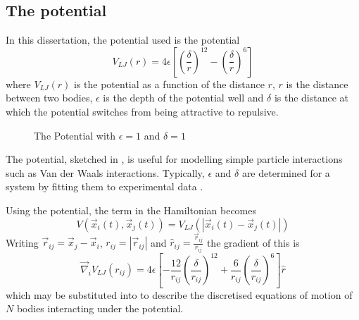 \subsection{The \LennardJones{} potential}
%
In this dissertation, the \twobody{} potential used is
the \LennardJones{} potential
\cite{jones1924determination}
%
\begin{equation}
    \label{eqn:the_lennard_jones_potential}
    V_{LJ}(r) = 4\epsilon \left[
        \left( \frac{\delta}{r} \right)^{12}
        - \left( \frac{\delta}{r} \right)^{6}
    \right]
\end  {equation}
where $V_{LJ}(r)$ is the \LennardJones{} potential as
a function of the distance $r$,
$r$ is the distance between two bodies,
$\epsilon$ is the depth of the potential well and
$\delta$ is the distance at which
the potential switches from being attractive to repulsive.

\begin{figure}
    
    \caption{
        The \LennardJones{} Potential with
        $\epsilon = 1$ and $\delta = 1$
    }
    \label{fig:lennard_jones_potential}
\end  {figure}

%
The \LennardJones{} potential, sketched in
,
is useful for modelling simple particle interactions such as
Van der Waals interactions.
%
Typically, $\epsilon$ and $\delta$ are determined for a system by
fitting them to experimental data
\cite[p.~250]{schlick2010molecular}.


%
Using the \LennardJones{} potential, the \twobody{} term in the Hamiltonian
becomes
\begin{equation}
    V(\vec{x}_i(t), \vec{x}_j(t)) = V_{LJ}(|\vec{x}_i(t) - \vec{x}_j(t)|)
\end  {equation}
%
Writing
$\vec{r}_{ij} = \vec{x}_j - \vec{x}_i$,
$r_{ij} = |\vec{r}_{ij}|$ and
$\hat{r}_{ij} = \frac{\vec{r}_{ij}}{r_{ij}}$
the gradient of this is
\begin{equation}
    \vec{\nabla}_i V_{LJ}(r_{ij}) = 4\epsilon \left[
        - \frac{12}{r_{ij}} \left( \frac{\delta}{r_{ij}} \right)^{12}
        + \frac{6}{r_{ij}} \left( \frac{\delta}{r_{ij}} \right)^{6}
    \right] \hat{r}
\end  {equation}
which may be substituted into  to describe
the discretised equations of motion of $N$ bodies interacting under the
\LennardJones{} potential.


